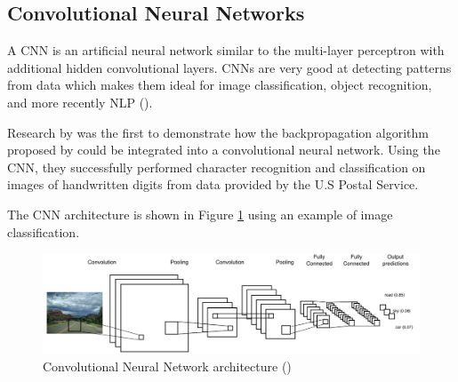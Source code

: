 


\subsection{Convolutional Neural Networks}


A \acrfull{CNN} is an artificial neural network similar to the multi-layer perceptron with additional hidden convolutional layers. \acrshort{CNN}s are very good at detecting patterns from data which makes them ideal for image classification, object recognition, and more recently \acrfull{NLP} (\cite{young_cnns_recent_2018}).

Research by \cite{lecun_backprop_cnn_1989} was the first to demonstrate how the backpropagation algorithm proposed by \cite{rumelhart_learning_1986} could be integrated into a convolutional neural network.
Using the \acrshort{CNN}, they successfully performed character recognition and classification on images of handwritten digits from data provided by the U.S Postal Service.

The \acrshort{CNN} architecture is shown in Figure \ref{fig:cnn_1} using an example of image classification.

\begin{figure}[ht!]
\centering
\includegraphics[width=1\textwidth]{media/literature/machine_learning/ml_cnn_1.png}
\caption[Diagram of a convolutional neural network architecture]{Convolutional Neural Network architecture (\cite{lopez_deep_2017})}
\label{fig:cnn_1}
\end{figure}

